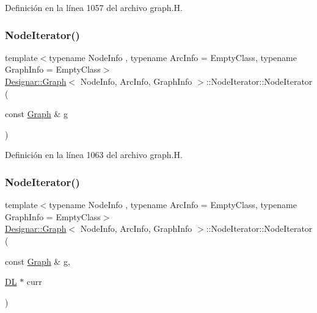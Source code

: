 Definición en la línea 1057 del archivo graph.\+H.

\mbox{\label{class_designar_1_1_graph_1_1_node_iterator_a646f28f9dbd99df7317dd0cf22122f42}} 
\subsubsection{\texorpdfstring{Node\+Iterator()}{NodeIterator()}\hspace{0.1cm}{\footnotesize\ttfamily [2/5]}}
{\footnotesize\ttfamily template$<$typename Node\+Info , typename Arc\+Info  = Empty\+Class, typename Graph\+Info  = Empty\+Class$>$ \\
\hyperlink{class_designar_1_1_graph}{Designar\+::\+Graph}$<$ Node\+Info, Arc\+Info, Graph\+Info $>$\+::Node\+Iterator\+::\+Node\+Iterator (\begin{DoxyParamCaption}\item[{const \hyperlink{class_designar_1_1_graph}{Graph} \&}]{g }\end{DoxyParamCaption})\hspace{0.3cm}{\ttfamily [inline]}}



Definición en la línea 1063 del archivo graph.\+H.

\mbox{\label{class_designar_1_1_graph_1_1_node_iterator_abc568563840c41429af62d925d45afc6}} 
\subsubsection{\texorpdfstring{Node\+Iterator()}{NodeIterator()}\hspace{0.1cm}{\footnotesize\ttfamily [3/5]}}
{\footnotesize\ttfamily template$<$typename Node\+Info , typename Arc\+Info  = Empty\+Class, typename Graph\+Info  = Empty\+Class$>$ \\
\hyperlink{class_designar_1_1_graph}{Designar\+::\+Graph}$<$ Node\+Info, Arc\+Info, Graph\+Info $>$\+::Node\+Iterator\+::\+Node\+Iterator (\begin{DoxyParamCaption}\item[{const \hyperlink{class_designar_1_1_graph}{Graph} \&}]{g,  }\item[{\hyperlink{class_designar_1_1_d_l}{DL} $\ast$}]{curr }\end{DoxyParamCaption})\hspace{0.3cm}{\ttfamily [inline]}}



